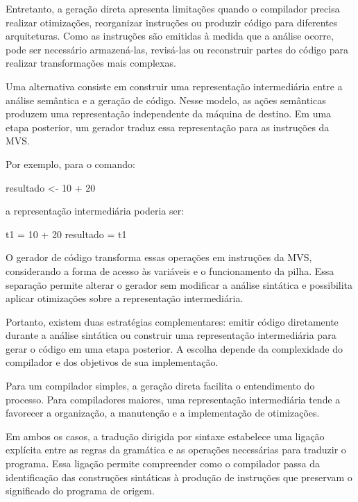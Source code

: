 \documentclass[
  brazilian,
  letterpaper,
]{book}
\newenvironment{Shaded}{\begin{snugshade}}{\end{snugshade}}
\newcommand{\DecValTok}[1]{\textcolor[rgb]{0.68,0.00,0.00}{#1}}
\newcommand{\NormalTok}[1]{\textcolor[rgb]{0.00,0.23,0.31}{#1}}
\newcommand{\OperatorTok}[1]{\textcolor[rgb]{0.37,0.37,0.37}{#1}}
\theoremstyle{plain}
\theoremstyle{definition}
\theoremstyle{remark}
\begin{document}
Entretanto, a geração direta apresenta limitações quando o compilador
precisa realizar otimizações, reorganizar instruções ou produzir código
para diferentes arquiteturas. Como as instruções são emitidas à medida
que a análise ocorre, pode ser necessário armazená-las, revisá-las ou
reconstruir partes do código para realizar transformações mais
complexas.

Uma alternativa consiste em construir uma representação intermediária
entre a análise semântica e a geração de código. Nesse modelo, as ações
semânticas produzem uma representação independente da máquina de
destino. Em uma etapa posterior, um gerador traduz essa representação
para as instruções da MVS.

Por exemplo, para o comando:

\begin{Shaded}
\begin{Highlighting}[]
\NormalTok{resultado \textless{}{-} }\DecValTok{10}\NormalTok{ + }\DecValTok{20}
\end{Highlighting}
\end{Shaded}

a representação intermediária poderia ser:

\begin{Shaded}
\begin{Highlighting}[]
\NormalTok{t1 }\OperatorTok{=} \DecValTok{10} \OperatorTok{+} \DecValTok{20}
\NormalTok{resultado }\OperatorTok{=}\NormalTok{ t1}
\end{Highlighting}
\end{Shaded}

O gerador de código transforma essas operações em instruções da MVS,
considerando a forma de acesso às variáveis e o funcionamento da pilha.
Essa separação permite alterar o gerador sem modificar a análise
sintática e possibilita aplicar otimizações sobre a representação
intermediária.

Portanto, existem duas estratégias complementares: emitir código
diretamente durante a análise sintática ou construir uma representação
intermediária para gerar o código em uma etapa posterior. A escolha
depende da complexidade do compilador e dos objetivos de sua
implementação.

Para um compilador simples, a geração direta facilita o entendimento do
processo. Para compiladores maiores, uma representação intermediária
tende a favorecer a organização, a manutenção e a implementação de
otimizações.

Em ambos os casos, a tradução dirigida por sintaxe estabelece uma
ligação explícita entre as regras da gramática e as operações
necessárias para traduzir o programa. Essa ligação permite compreender
como o compilador passa da identificação das construções sintáticas à
produção de instruções que preservam o significado do programa de
origem.
\end{document}
